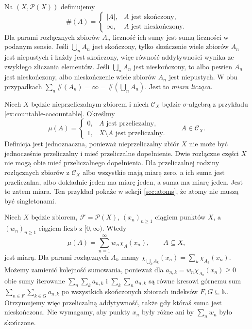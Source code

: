 \begin{przyklad}
\label{ex:counting}
Na $(X,\mathcal P(X))$ definiujemy
\[
\#(A)=\begin{cases}
|A|,&A\text{ jest skończony},\\
\infty,&A\text{ jest nieskończony}.
\end{cases}
\]
Dla parami rozłącznych zbiorów $A_n$ liczność ich sumy jest sumą
liczności w podanym sensie. Jeśli $\bigcup_n A_n$ jest skończony,
tylko skończenie wiele zbiorów $A_n$ jest niepustych i każdy
jest skończony, więc równość addytywności wynika ze
zwykłego zliczania elementów. Jeśli $\bigcup_n A_n$
jest nieskończony, to albo pewien $A_n$ jest nieskończony,
albo nieskończenie wiele zbiorów $A_n$ jest niepustych.
W obu przypadkach $\sum_n\#(A_n)=\infty=\#(\bigcup_nA_n)$.
Jest to \emph{miara licząca}.
\end{przyklad}

\begin{przyklad}
\label{ex:cocountable-measure}
Niech $X$ będzie nieprzeliczalnym zbiorem i niech
$\mathcal C_X$ będzie $\sigma$-algebrą z przykładu
\ref{ex:countable-cocountable}. Określmy
\[
\mu(A)=\begin{cases}
0,&A\text{ jest przeliczalny},\\
1,&X\setminus A\text{ jest przeliczalny}.
\end{cases}
\qquad A\in\mathcal C_X.
\]
Definicja jest jednoznaczna, ponieważ nieprzeliczalny zbiór
$X$ nie może być jednocześnie przeliczalny i mieć przeliczalne
dopełnienie. Dwie rozłączne części $X$ nie mogą obie mieć
przeliczalnego dopełnienia. Dla przeliczalnej rodziny
rozłącznych zbiorów z $\mathcal C_X$ albo wszystkie mają miarę
zero, a ich suma jest przeliczalna, albo dokładnie jeden ma
miarę jeden, a suma ma miarę jeden. Jest to zatem miara.
Ten przykład pokaże w sekcji \ref{sec:atoms}, że atomy
nie muszą być singletonami.
\end{przyklad}

\begin{przyklad}
\label{ex:weighted-discrete}
Niech $X$ będzie zbiorem, $\mathcal F=\mathcal P(X)$,
$(x_n)_{n\geq1}$ ciągiem punktów $X$, a $(w_n)_{n\geq1}$
ciągiem liczb z $[0,\infty)$. Wtedy
\[
\mu(A)=\sum_{n=1}^{\infty}w_n\chi_A(x_n),
\qquad A\subseteq X,
\]
jest miarą. Dla parami rozłącznych $A_k$ mamy
$\chi_{\bigcup_k A_k}(x_n)=\sum_k\chi_{A_k}(x_n)$.
Możemy zamienić kolejność sumowania, ponieważ dla
$a_{n,k}=w_n\chi_{A_k}(x_n)\geq0$ obie sumy iterowane
$\sum_n\sum_k a_{n,k}$ i $\sum_k\sum_n a_{n,k}$
są równe kresowi górnemu sum
$\sum_{n\in F}\sum_{k\in G}a_{n,k}$
po wszystkich skończonych zbiorach indeksów $F,G\subseteq\mathbb N$.
Otrzymujemy więc przeliczalną addytywność, także gdy
któraś suma jest nieskończona. Nie wymagamy, aby punkty
$x_n$ były różne ani by $\sum_nw_n$ było skończone.
\end{przyklad}

